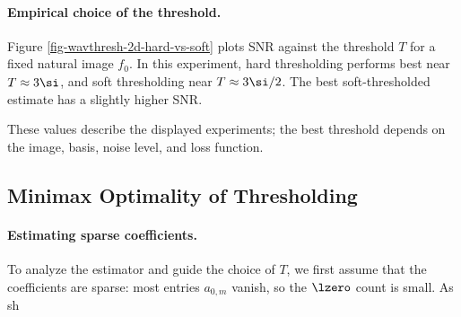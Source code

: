   
\paragraph{Empirical choice of the threshold.}

Figure \ref{fig-wavthresh-2d-hard-vs-soft} plots SNR against the threshold $T$ for a fixed natural image $f_0$. In this experiment, hard thresholding performs best near $T \approx 3\si$, and soft thresholding near $T\approx 3\si/2$. The best soft-thresholded estimate has a slightly higher SNR.


These values describe the displayed experiments; the best threshold depends on the image, basis, noise level, and loss function.


                                                     
\subsection{Minimax Optimality of Thresholding}
\label{subsec-minimax-denoise}

  
\paragraph{Estimating sparse coefficients.}

To analyze the estimator and guide the choice of $T$, we first assume that the coefficients
are sparse: most entries $a_{0,m}$ vanish, so the $\lzero$ count
is small. 
As sh